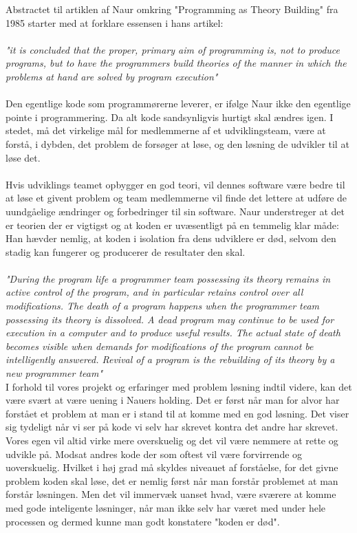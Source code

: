 \documentclass[12pt]{article}
\begin{document}
Abstractet til artiklen af Naur omkring "Programming as Theory Building" fra 1985 starter med at forklare essensen i hans artikel:\\\\
\textit{
"it is concluded that the proper, primary aim of programming is, not to produce programs, but to have the programmers build theories of the manner in which the problems at hand are solved by program execution"}\\\\
Den egentlige kode som programmørerne leverer, er ifølge Naur ikke den egentlige pointe i programmering. Da alt kode sandsynligvis hurtigt skal ændres igen. I stedet, må det virkelige mål for medlemmerne af et udviklingsteam, være at forstå, i dybden, det problem de forsøger at løse, og den løsning de udvikler til at løse det.\\\\
Hvis udviklings teamet opbygger en god teori, vil dennes software være bedre til at løse et givent problem og team medlemmerne vil finde det lettere at udføre de uundgåelige ændringer og forbedringer til sin software. Naur understreger at det er teorien der er vigtigst og at koden er uvæsentligt på en temmelig klar måde: Han hævder nemlig, at koden i isolation fra dens udviklere er død, selvom den stadig kan fungerer og producerer de resultater den skal.\\\\
\textit{"During the program life a programmer team possessing its theory remains in active control of the program, and in particular retains control over all modifications. The death of a program happens when the programmer team possessing its theory is dissolved. A dead program may continue to be used for execution in a computer and to produce useful results. The actual state of death becomes visible when demands for modifications of the program cannot be intelligently answered. Revival of a program is the rebuilding of its theory by a new programmer team"}\\
\newpage
\noindent I forhold til vores projekt og erfaringer med problem løsning indtil videre, kan det være svært at være uening i Nauers holding. Det er først når man for alvor har forstået et problem at man er i stand til at komme med en god løsning. Det viser sig tydeligt når vi ser på kode vi selv har skrevet kontra det andre har skrevet. Vores egen vil altid virke mere overskuelig og det vil være nemmere at rette og udvikle på. Modsat andres kode der som oftest vil være forvirrende og uoverskuelig. Hvilket i høj grad må skyldes niveauet af forståelse, for det givne problem koden skal løse, det er nemlig først når man forstår problemet at man forstår løsningen. Men det vil immervæk uanset hvad, være sværere at komme med gode inteligente løsninger, når man ikke selv har været med under hele processen og dermed kunne man godt konstatere "koden er død".
\newpage
\end{document}
